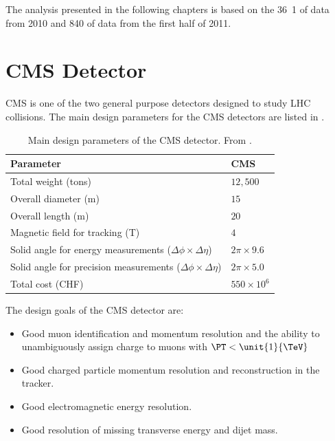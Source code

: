 The analysis presented in the following chapters is based on the
\unit{36.1}{\invpb} of data from  2010 and \unit{840}{\invpb} of data from the first half of 2011.

\section{CMS Detector}
{CMS}\cite{chatrchyan2008cms} is one of the two general purpose
detectors designed to study LHC collisions. The main design parameters for the
{CMS} detectors  are listed in .

\begin{table}[htbp]
\begin{center}
\begin{tabular}{ l l }
\toprule
Parameter & CMS \\
\midrule
Total weight (tons)                 & $12,500$  \\
Overall diameter (m)                & $15$  \\
Overall length (m)                  & $20$  \\
Magnetic field for tracking (T)     & $4$  \\
Solid angle for energy measurements ($\Delta\phi \times \Delta\eta$)   
                                    & $2\pi \times 9.6$  \\
Solid angle for precision measurements ($\Delta\phi \times \Delta\eta$)   
                                    & $2\pi \times 5.0$  \\
Total cost (CHF)                    & $550\times 10 ^{6}$  \\
\bottomrule
\end{tabular}
\caption[Main design parameters of the CMS detector.]{Main design parameters of
the CMS detector. From \cite{froidevaux2006general}.\label{tab:cmsparam}}
\end{center}
\end{table}

The design goals of the CMS detector are:
\begin{itemize}
  \item Good muon identification and momentum resolution and the ability to
unambiguously assign charge to muons with $\PT < \unit{1}{\TeV}$
  \item Good charged particle momentum resolution and reconstruction in the
tracker.
  \item Good electromagnetic energy resolution. 
  \item Good resolution of missing transverse energy and dijet mass.
\end{itemize}

